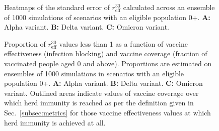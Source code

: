 \documentclass[article, a4, authoryear]{elsarticle}
\begin{document}
 

\begin{figure}[H]
    \centering
    \hfill
    \hfill
    \hfill
    \caption{Heatmaps of the standard error of $r_\mathrm{eff}^{30}$ calculated across an ensemble of 1000 simulations of scenarios with an eligible population 0+. \textbf{A:} Alpha variant. \textbf{B:} Delta variant. \textbf{C:} Omicron variant.} 
    \label{sup:fig:heatmap_plot_reff_sem}
\end{figure}

\begin{figure}[H]
    \centering
    \hfill
    \hfill
    \hfill
    \caption{Proportion of $r_\mathrm{eff}^{30}$ values less than 1 as a function of vaccine effectiveness (infection blocking) and vaccine coverage (fraction of vaccinated people aged 0 and above). Proportions are estimated on ensembles of 1000 simulations in scenarios with an eligible population 0+. \textbf{A:} Alpha variant. \textbf{B:} Delta variant. \textbf{C:} Omicron variant. Outlined areas indicate values of vaccine coverage over which herd immunity is reached as per the definition given in Sec.~\ref{subsec:metrics} for those vaccine effectiveness values at which herd immunity is achieved at all.} 
    \label{sup:fig:heatmap_plot_reff_proportion}
\end{figure}
\end{document}
